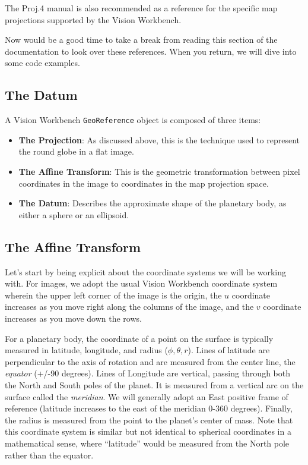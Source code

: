 The Proj.4 manual is also recommended as a reference for the specific
map projections supported by the Vision Workbench.

Now would be a good time to take a break from reading this section of
the documentation to look over these references.  When you return, we
will dive into some code examples.  

\subsection{The Datum}

A Vision Workbench \verb#GeoReference# object is composed of three items:

\begin{itemize}
\item {\bf The Projection}: As discussed above, this is the technique
  used to represent the round globe in a flat image.
\item {\bf The Affine Transform}: This is the geometric transformation
  between pixel coordinates in the image to coordinates in the map
  projection space.
\item {\bf The Datum}: Describes the approximate shape of the
  planetary body, as either a sphere or an ellipsoid.
\end{itemize}

\subsection{The Affine Transform}

Let's start by being explicit about the coordinate systems we will be
working with.  For images, we adopt the usual Vision Workbench
coordinate system wherein the upper left corner of the image is the
origin, the $u$ coordinate increases as you move right along the
columns of the image, and the $v$ coordinate increases as you move
down the rows.  

For a planetary body, the coordinate of a point on the surface is
typically measured in latitude, longitude, and radius ($\phi, \theta,
r$).  Lines of latitude are perpendicular to the axis of rotation and
are measured from the center line, the {\em equator} (+/-90 degrees).
Lines of Longitude are vertical, passing through both the North and
South poles of the planet.  It is measured from a vertical arc on the
surface called the {\em meridian}.  We will generally adopt an East
positive frame of reference (latitude increases to the east of the
meridian 0-360 degrees).  Finally, the radius is measured from the
point to the planet's center of mass.  Note that this coordinate
system is similar but not identical to spherical coordinates in a
mathematical sense, where ``latitude'' would be measured from the
North pole rather than the equator.

